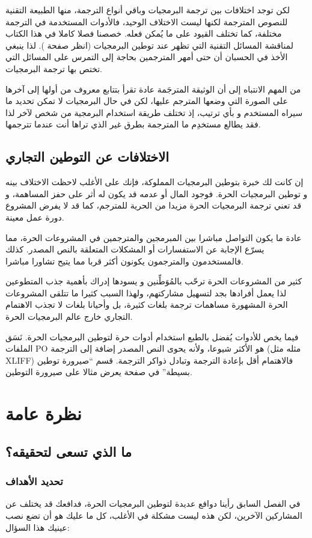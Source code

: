 لكن توجد اختلافات بين ترجمة البرمجيات وباقي أنواع الترجمة، منها الطبيعة
التقنية للنصوص المترجمة لكنها ليست الاختلاف الوحيد، فالأدوات المستخدمة
في الترجمة مختلفة، كما تختلف القيود على ما يُمكن فعله. خصصنا فصلا كاملا
في هذا الكتاب لمناقشة المسائل التقنية التي تظهر عند توطين البرمجيات
(انظر صفحة ). لذا ينبغي الأخذ في الحسبان أن
حتى أمهر المترجمين بحاجة إلى التمرس على المسائل التي تختص بها ترجمة
البرمجيات.

من المهم الانتباه إلى أن الوثيقة المترجَمة عادة تقرأ بتتابع معروف من
أولها إلى آخرها على الصورة التي وضعها المترجم عليها، لكن في حال
البرمجيات لا تمكن تحديد ما سيراه المستخدم و بأي ترتيب، إذ تختلف طريقة
استخدام البرمجية من شخص لآخر لذا فقد يطالع مستخدِم ما المترجمة بطرق غير
الذي تراها أنت عندما تترجمها.

\section{الاختلافات عن التوطين التجاري}
إن كانت لك خبرة بتوطين البرمجيات المملوكة، فإنك على الأغلب لاحظت
الاختلاف بينه و توطين البرمجيات الحرة. فوجود المال أو عدمه قد يكون له
أثر على حفز المساهمة، و قد تعني ترجمة البرمجيات الحرة مزيدا من الحرية
للمترجم، كما قد لا يفرض المشروع دورة عمل معينة.

عادة ما يكون التواصل مباشرا بين المبرمجين والمترجمين في المشروعات الحرة،
مما يسرّع الإجابة عن الاستفسارات أو المشكلات المتعلقة بالنص المصدر.
كذلك فالمستخدمون والمترجمون يكونون أكثر قربا مما يتيح تشاورا مباشرا.

كثير من المشروعات الحرة ترحّب بالمُوَطِّنين و يسودها إدراك بأهمية جذب
المتطوعين لذا يعمل أفرادها بجد لتسهيل مشاركتهم، ولهذا السبب كثيرا ما
تتلقى المشروعات الحرة المشهورة مساهمات ترجمة بلغات كثيرة، بل وأحيانا
بلغات لا تجذب الاهتمام التجاري خارج عالم البرمجيات الحرة.

فيما يخص للأدوات يُفضل بالطبع استخدام أدوات حرة لتوطين البرمجيات الحرة.
نَسَق الملفات PO هو الأكثر شيوعا، ولأنه يحوى النص المصدر إضافة إلى
الترجمة (مثله مثل XLIFF) فالاهتمام أقل بإعادة الترجمة وتبادل ذواكر
الترجمة. قسم “صيرورة توطين بسيطة” في صفحة 
يعرض مثالا على صيرورة التوطين.

\chapter{نظرة عامة}
\section{ما الذي تسعى لتحقيقه؟}
\subsection{تحديد الأهداف}
في الفصل السابق رأينا دوافع عديدة لتوطين البرمجيات الحرة، فدافعك قد
يختلف عن المشاركين الآخرين، لكن هذه ليست مشكلة في الأغلب، كل ما عليك هو
أن تضع نصب عينيك هذا السؤال:


